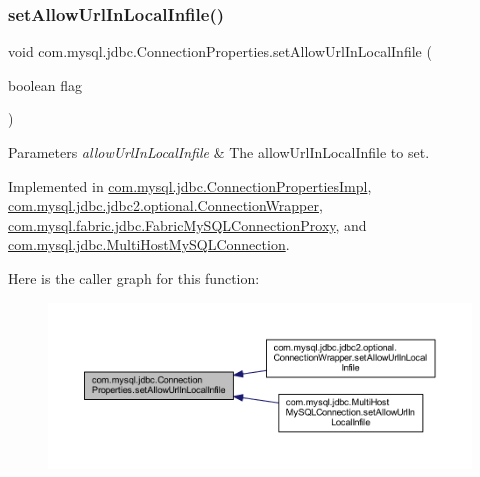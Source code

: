 \subsubsection{\texorpdfstring{set\+Allow\+Url\+In\+Local\+Infile()}{setAllowUrlInLocalInfile()}}
{\footnotesize\ttfamily void com.\+mysql.\+jdbc.\+Connection\+Properties.\+set\+Allow\+Url\+In\+Local\+Infile (\begin{DoxyParamCaption}\item[{boolean}]{flag }\end{DoxyParamCaption})}


\begin{DoxyParams}{Parameters}
{\em allow\+Url\+In\+Local\+Infile} & The allow\+Url\+In\+Local\+Infile to set. \\
\hline
\end{DoxyParams}


Implemented in \mbox{\hyperlink{classcom_1_1mysql_1_1jdbc_1_1_connection_properties_impl_ab8ebf032ddbdb9dfc7481bf877915c58}{com.\+mysql.\+jdbc.\+Connection\+Properties\+Impl}}, \mbox{\hyperlink{classcom_1_1mysql_1_1jdbc_1_1jdbc2_1_1optional_1_1_connection_wrapper_ae47387cb708cc1dfa15cda434a2738aa}{com.\+mysql.\+jdbc.\+jdbc2.\+optional.\+Connection\+Wrapper}}, \mbox{\hyperlink{classcom_1_1mysql_1_1fabric_1_1jdbc_1_1_fabric_my_s_q_l_connection_proxy_ac0788c351b7b7ccbe8fb41afd301be91}{com.\+mysql.\+fabric.\+jdbc.\+Fabric\+My\+S\+Q\+L\+Connection\+Proxy}}, and \mbox{\hyperlink{classcom_1_1mysql_1_1jdbc_1_1_multi_host_my_s_q_l_connection_a65ced19d9988a77826c138d8d2f1574e}{com.\+mysql.\+jdbc.\+Multi\+Host\+My\+S\+Q\+L\+Connection}}.

Here is the caller graph for this function\+:\nopagebreak
\begin{figure}[H]
\begin{center}
\leavevmode
\includegraphics[width=350pt]{interfacecom_1_1mysql_1_1jdbc_1_1_connection_properties_ad7e99f72c64f4572e9952747489da7b4_icgraph}
\end{center}
\end{figure}
\mbox{\label{interfacecom_1_1mysql_1_1jdbc_1_1_connection_properties_a009faf68759b3c9b1c03a15abeff987c}} 
